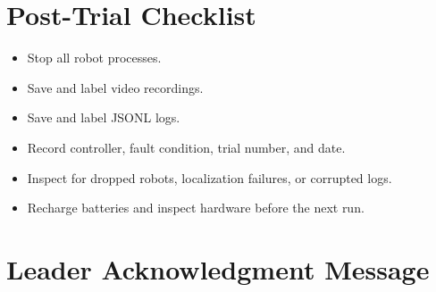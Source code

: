 \documentclass[a4paper,oneside,titlepage,11pt]{report}
\begin{document}
\section{Post-Trial Checklist}
\begin{itemize}
    \item Stop all robot processes.
    \item Save and label video recordings.
    \item Save and label JSONL logs.
    \item Record controller, fault condition, trial number, and date.
    \item Inspect for dropped robots, localization failures, or corrupted logs.
    \item Recharge batteries and inspect hardware before the next run.
\end{itemize}


\section{Leader Acknowledgment Message}
\end{document}
